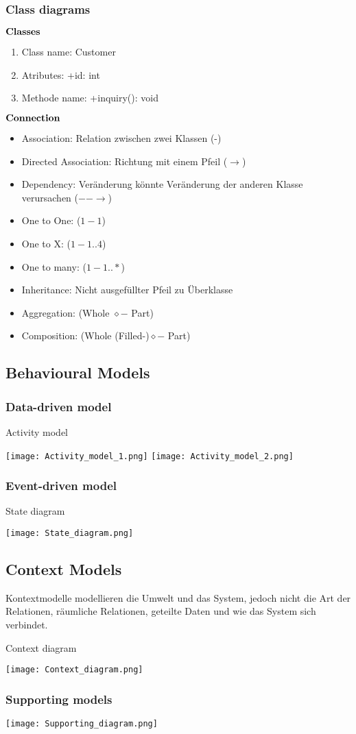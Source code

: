 \subsubsection{Class diagrams}
$\bold{Classes}$
\begin{enumerate}
	\item Class name: Customer
	\item Atributes: +id: int 
	\item Methode name: +inquiry(): void
\end{enumerate}
$\bold{Connection}$
\begin{itemize}
	\item Association: Relation zwischen zwei Klassen (-)
	\item Directed Association: Richtung mit einem Pfeil ($\to$)
	\item Dependency: Veränderung könnte Veränderung der anderen Klasse verursachen ($- - \to$)
	\item One to One: ($1 - 1$)
	\item One to X: ($1 - 1..4$)
	\item One to many: ($1 - 1..*$)
	\item Inheritance: Nicht ausgefüllter Pfeil zu Überklasse
	\item Aggregation: (Whole $\diamond-$ Part)
	\item Composition: (Whole (Filled-)$\diamond -$ Part)
\end{itemize}
\subsection{Behavioural Models}
\subsubsection{Data-driven model}
\begin{table}[H]
\caption{Activity model}	
\texttt{[image: Activity\_model\_1.png]}
\texttt{[image: Activity\_model\_2.png]}
\end{table}
\subsubsection{Event-driven model}
\begin{table}[H]
\caption{State diagram}
\texttt{[image: State\_diagram.png]}	
\end{table}
\subsection{Context Models}
Kontextmodelle modellieren die Umwelt und das System, jedoch nicht die Art der Relationen, räumliche Relationen, geteilte Daten und wie das System sich verbindet.
\begin{table}[H]
\caption{Context diagram}
\texttt{[image: Context\_diagram.png]}	
\end{table}
\subsubsection{Supporting models}
\begin{table}[H]
\texttt{[image: Supporting\_diagram.png]}	
\end{table}


 




